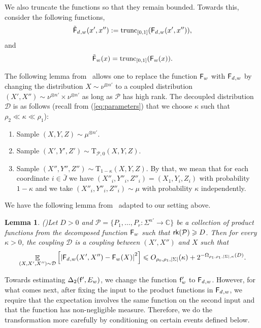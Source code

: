 \documentclass[10pt,a4paper]{amsart}
\newtheorem{lemma}[thm]{Lemma}
\newcommand\card[1]{\left| {#1} \right|}
\newcommand\Expect[2]{{\mathop{\mathbb{E}}_{#1}\left[ {#2} \right]}}
\renewcommand\geq{\geqslant}
\renewcommand\leq{\leqslant}
\newcommand{\V}[1]{{#1}}
\begin{document}
We also truncate the functions so that they remain bounded. Towards this, consider the following functions,
    $$\truncfcoarsedecoupled_{,\V w}(\V x', \V x'') := \mathrm{trunc}_{[0,1]}(\fcoarsedecoupled_{, \V w}(\V x', \V x'')),$$
and
$$\truncfcoarsedecomposed_{\V w}(\V x) = \mathrm{trunc}_{[0,1]}(\fcoarsedecomposed_{\V w}(\V x)).$$



The following lemma from~\cite{BKM5} allows one to replace the function $\fcoarsedecomposed_{\V w} $ with $\fcoarsedecoupled_{, \V w}$ by changing the distribution $X\sim \nu^{\otimes n'}$ to a coupled distribution $(X', X'') \sim \nu^{\otimes n'}\times  \nu^{\otimes n'}$ as long as $\mathcal{P}$ has high rank. The decoupled distribution $\mathcal{D}$ is as follows (recall from (\ref{eq:parameters}) that we choose $\kappa$ such that $\rho_2\ll \kappa\ll \rho_1$):
   \begin{enumerate}
            \item Sample $(X,Y,Z)\sim \mu^{\otimes n'}$.
            \item Sample 
            $(X',Y',Z')\sim \mathrm{T}_{\mathcal{\mathcal{P}},0} (X,Y,Z)$.
            \item Sample $(X'',Y'',Z'')\sim \mathrm{T}_{1-\kappa}(X,Y,Z)$. By that, we mean that for each coordinate $i\in \bar{J}$ we have
$(X''_i,Y''_i,Z''_i) = (X_1, Y_i, Z_i)$ with probability $1-\kappa$ and we take $(X''_i,Y''_i,Z''_i)\sim \mu$ with probability $\kappa$ independently.
\end{enumerate}

We have the following lemma from~\cite{BKM5} adapted to our setting above.
\begin{lemma}(\cite[Lemma 6.7]{BKM5})\label{lem:decoupled_move}
		Let $D>0$ and $\mathcal{P} = \{P_1,\ldots,P_r\colon \Sigma^{n'}\to\mathbb{C}\}$ be a collection of
		product functions from the decomposed function $\fcoarsedecomposed_{\V w}$ such that ${\sf rk}(\mathcal{P})\geq D$. Then for every $\kappa>0$, the coupling $\mathcal{D}$ is a coupling between $(X',X'')$ and $X$ such that
		\[
		\Expect{(X,X',X'')\sim \mathcal{D}}{\card{\fcoarsedecoupled_{,\V w}(X',X'') - \fcoarsedecomposed_{\V w}(X)}^2}
		\leq O_{\rho_0, \rho_1, |\Sigma|}(\kappa) +  2^{-\Omega_{\rho_1, \rho_1,|\Sigma|,\kappa}(D)}.
		\]
	\end{lemma}

Towards estimating $\Delta_2(\noisyfrefined, E_{\V w})$, we change the function $\noisyfrefined_{\V w}$ to $\fcoarsedecoupled_{,\V w}$. However, for what comes next, after fixing the input to the product functions in $\fcoarsedecoupled_{,\V w}$, we require that the expectation involves the same function on the second input and that the function has non-negligible measure. Therefore, we do the transformation more carefully by conditioning on certain events defined below.
\end{document}
